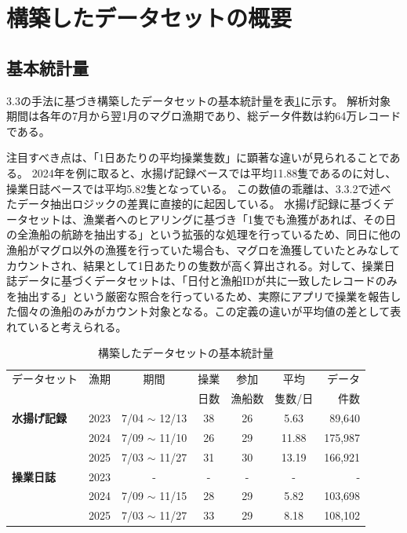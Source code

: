\section{構築したデータセットの概要}
\label{sec:dataset_overview}

\subsection{基本統計量}
3.3の手法に基づき構築したデータセットの基本統計量を表\ref{tab:dataset_stats}に示す。
解析対象期間は各年の7月から翌1月のマグロ漁期であり、総データ件数は約64万レコードである。

注目すべき点は、「1日あたりの平均操業隻数」に顕著な違いが見られることである。
2024年を例に取ると、水揚げ記録ベースでは平均11.88隻であるのに対し、操業日誌ベースでは平均5.82隻となっている。
この数値の乖離は、3.3.2で述べたデータ抽出ロジックの差異に直接的に起因している。 水揚げ記録に基づくデータセットは、漁業者へのヒアリングに基づき「1隻でも漁獲があれば、その日の全漁船の航跡を抽出する」という拡張的な処理を行っているため、同日に他の漁船がマグロ以外の漁獲を行っていた場合も、マグロを漁獲していたとみなしてカウントされ、結果として1日あたりの隻数が高く算出される。対して、操業日誌データに基づくデータセットは、「日付と漁船IDが共に一致したレコードのみを抽出する」という厳密な照合を行っているため、実際にアプリで操業を報告した個々の漁船のみがカウント対象となる。この定義の違いが平均値の差として表れていると考えられる。

\begin{table}[htbp]
  \centering
  \caption{構築したデータセットの基本統計量}
  \label{tab:dataset_stats}
  \begin{tabular}{lcccccr}
    \hline
    データセット & 漁期 & 期間 & 操業 & 参加 & 平均 & データ \\
     & & & 日数 & 漁船数 & 隻数/日 & 件数 \\
    \hline
    \textbf{水揚げ記録} & 2023 & 7/04 $\sim$ 12/13 & 38 & 26 & 5.63 & 89,640 \\
     & 2024 & 7/09 $\sim$ 11/10 & 26 & 29 & 11.88 & 175,987 \\
     & 2025 & 7/03 $\sim$ 11/27 & 31 & 30 & 13.19 & 166,921 \\
    \hline
    \textbf{操業日誌} 
    & 2023 & - & - & - & - & - \\
    & 2024 & 7/09 $\sim$ 11/15 & 28 & 29 & 5.82 & 103,698 \\
    & 2025 & 7/03 $\sim$ 11/27 & 33 & 29 & 8.18 & 108,102 \\
    \hline
  \end{tabular}
\end{table}

